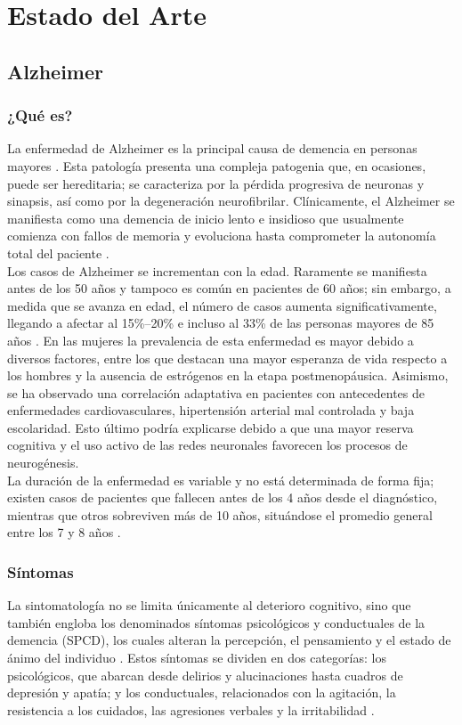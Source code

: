 \chapter{Estado del Arte}
\section{Alzheimer}
\subsection{¿Qué es?}
La enfermedad de Alzheimer es la principal causa de demencia en personas mayores \cite{donoso2003enfermedad, romano2007enfermedad}. Esta patología presenta una compleja patogenia que, en ocasiones, puede ser hereditaria; se caracteriza por la pérdida progresiva de neuronas y sinapsis, así como por la degeneración neurofibrilar. Clínicamente, el Alzheimer se manifiesta como una demencia de inicio lento e insidioso que usualmente comienza con fallos de memoria y evoluciona hasta comprometer la autonomía total del paciente \cite{merino2015enfermedad}.\\

Los casos de Alzheimer se incrementan con la edad. Raramente se manifiesta antes de los 50 años y tampoco es común en pacientes de 60 años; sin embargo, a medida que se avanza en edad, el número de casos aumenta significativamente, llegando a afectar al 15\%--20\% e incluso al 33\% de las personas mayores de 85 años \cite{donoso2003enfermedad}. En las mujeres la prevalencia de esta enfermedad es mayor debido a diversos factores, entre los que destacan una mayor esperanza de vida respecto a los hombres y la ausencia de estrógenos en la etapa postmenopáusica. Asimismo, se ha observado una correlación adaptativa en pacientes con antecedentes de enfermedades cardiovasculares, hipertensión arterial mal controlada y baja escolaridad. Esto último podría explicarse debido a que una mayor reserva cognitiva y el uso activo de las redes neuronales favorecen los procesos de neurogénesis.\\

La duración de la enfermedad es variable y no está determinada de forma fija; existen casos de pacientes que fallecen antes de los 4 años desde el diagnóstico, mientras que otros sobreviven más de 10 años, situándose el promedio general entre los 7 y 8 años \cite{donoso2003enfermedad}.

\subsection{Síntomas}
La sintomatología no se limita únicamente al deterioro cognitivo, sino que también engloba los denominados síntomas psicológicos y conductuales de la demencia (SPCD), los cuales alteran la percepción, el pensamiento y el estado de ánimo del individuo \cite{romero2018importancia, reyes2010sintomas}. Estos síntomas se dividen en dos categorías: los psicológicos, que abarcan desde delirios y alucinaciones hasta cuadros de depresión y apatía; y los conductuales, relacionados con la agitación, la resistencia a los cuidados, las agresiones verbales y la irritabilidad \cite{romero2018importancia}.\\

